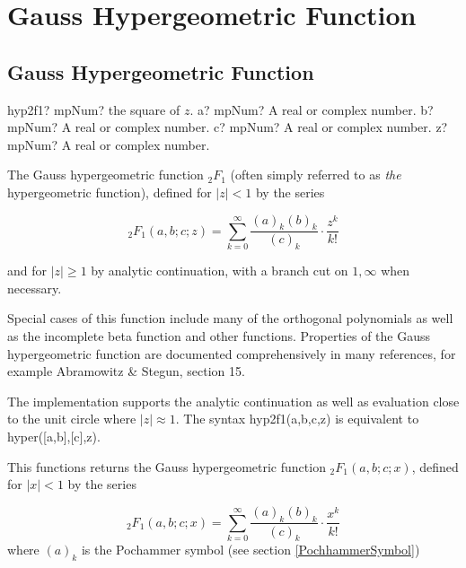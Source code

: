 \newpage

\section{Gauss Hypergeometric Function}

\subsection{Gauss Hypergeometric Function}
\label{sec:Hypergeometric2F1MpMath}
\begin{mpFunctionsExtract}
	\mpFunctionFour
	{hyp2f1? mpNum? the square of $z$.}
	{a? mpNum? A real or complex number.}
	{b? mpNum? A real or complex number.}
	{c? mpNum? A real or complex number.}
	{z? mpNum? A real or complex number.}
\end{mpFunctionsExtract}

\vpara
The Gauss hypergeometric function ${}_2F_1$ (often simply referred to as \textit{the} hypergeometric function), defined for
$| z | < 1$ by the series 

\begin{equation}
 {}_2F_1(a,b;c;z) = \sum_{k=0}^\infty\frac{(a)_k(b)_k}{(c)_k}\cdot\frac{z^k}{k!}
\end{equation}

and for $|z| \geq 1$ by analytic continuation, with a branch cut on $1,\infty$ when necessary.

\vpara
Special cases of this function include many of the orthogonal polynomials as well as the incomplete beta function and other functions. Properties of the Gauss hypergeometric function are documented comprehensively in many references, for example Abramowitz \& Stegun, section 15.

\vpara
The implementation supports the analytic continuation as well as evaluation close to the unit circle where $|z| \approx 1$. The syntax hyp2f1(a,b,c,z) is equivalent to hyper([a,b],[c],z).


\vspace{0.3cm}
This functions returns the Gauss hypergeometric function ${}_2F_1(a, b; c; x)$, defined for
$| x | < 1$ by the series 

\begin{equation}
{}_2F_1(a,b;c;x) = \sum_{k=0}^\infty\frac{(a)_k(b)_k}{(c)_k}\cdot\frac{x^k}{k!}
\end{equation}
where $(a)_k$ is the Pochammer symbol (see section \ref{PochhammerSymbol})


